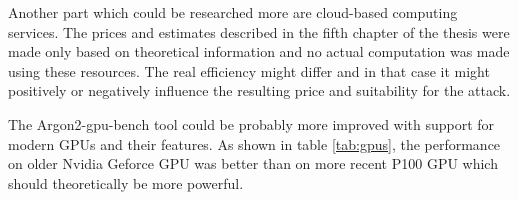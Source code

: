 \documentclass[nolof]{fithesis3}
\begin{document}
Another part which could be researched more are cloud-based computing services. The prices and estimates described in the fifth chapter of the thesis were made only based on theoretical information and no actual computation was made using these resources. The real efficiency might differ and in that case it might positively or negatively influence the resulting price and suitability for the attack.

The Argon2-gpu-bench tool could be probably more improved with support for modern GPUs and their features. As shown in table \ref{tab:gpus}, the performance on older Nvidia Geforce GPU was better than on more recent P100 GPU which should theoretically be more powerful.





\printbibliography
\end{document}

